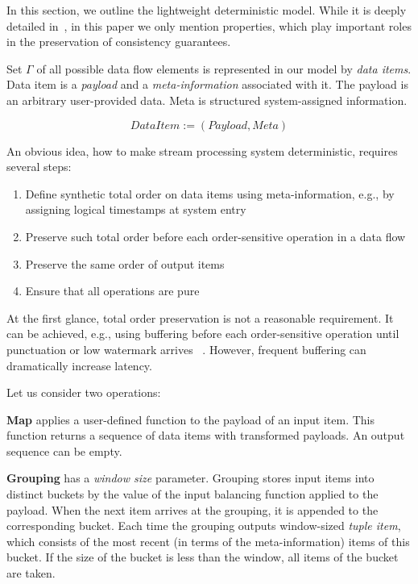 
\label {fs-model-section}

In this section, we outline the lightweight deterministic model. While it is deeply detailed in~\cite{we2018adbis}, in this paper we only mention properties, which play important roles in the preservation of consistency guarantees.

Set $\Gamma$ of all possible data flow elements is represented in our model by {\em data items}. Data item is a {\it payload} and a {\it meta-information} associated with it. The payload is an arbitrary user-provided data. Meta is structured system-assigned information.

\[DataItem := (Payload, Meta)\]

An obvious idea, how to make stream processing system deterministic, requires several steps:
\begin{enumerate}
    \item Define synthetic total order on data items using meta-information, e.g., by assigning logical timestamps at system entry
    \item Preserve such total order before each order-sensitive operation in a data flow
    \item Preserve the same order of output items
    \item Ensure that all operations are pure
\end{enumerate}

At the first glance, total order preservation is not a reasonable requirement. It can be achieved, e.g., using buffering before each order-sensitive operation until punctuation or low watermark arrives ~\cite{Li:2008:OPN:1453856.1453890}. However, frequent buffering can dramatically increase latency. 

Let us consider two operations:

{\bf Map} applies a user-defined function to the payload of an input item. This function returns a sequence of data items with transformed payloads. An output sequence can be empty.

{\bf Grouping} has a {\it window size} parameter. Grouping stores input items into distinct buckets by the value of the input balancing function applied to the payload. When the next item arrives at the grouping, it is appended to the corresponding bucket. Each time the grouping outputs window-sized {\it tuple item}, which consists of the most recent (in terms of the meta-information) items of this bucket. If the size of the bucket is less than the window, all items of the bucket are taken.

